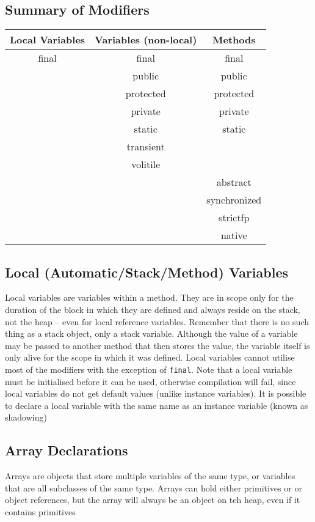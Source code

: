 \subsection{Summary of Modifiers}
\begin{center}
\begin{tabular}{ccc}
    \textbf{Local Variables} & \textbf{Variables (non-local)} & 
    \textbf{Methods} \\
    \hline
    final & final & final \\
    & public & public \\
    & protected & protected \\
    & private & private \\
    & static & static \\
    & transient & \\
    & volitile & \\
    & & abstract \\
    & & synchronized \\
    & & strictfp \\
    & & native \\
\end{tabular}
\end{center}

\subsection{Local (Automatic/Stack/Method) Variables}
Local variables are variables within a method. They are in scope only for the 
duration of the block in which they are defined and always reside on the stack, 
not the heap -- even for local reference variables. Remember that there is no 
such thing as a stack object, only a stack variable. Although the value of a 
variable may be passed to another method that then stores the value, the 
variable itself is only alive for the scope in which it was defined. Local 
variables cannot utilise most of the modifiers with the exception of 
\verb#final#. Note that a local variable must be initialised before it can be 
used, otherwise compilation will fail, since local variables do not get default 
values (unlike instance variables). It is possible to declare a local variable 
with the same name as an instance variable (known as shadowing)

\subsection{Array Declarations}
Arrays are objects that store multiple variables of the same type, or variables 
that are all subclasses of the same type. Arrays can hold either primitives or 
or object references, but the array will always be an object on teh heap, even 
if it contains primitives

